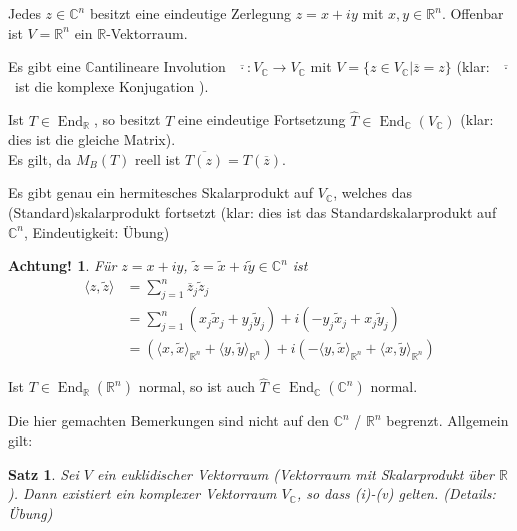 \documentclass[12pt,a4paper]{article}
\newtheorem{theorem}{Satz}
\newtheorem*{attention}{Achtung!}
\theoremstyle{definition}
\theoremstyle{remark}
\renewcommand{\bar}[1]{\overline{#1}}
\renewcommand{\hat}[1]{\widehat{#1}}
\DeclareMathOperator{\End}{End}
\begin{document}
	\begin{proofenum}
		\item Jedes $z \in \mathbb{C}^n$ besitzt eine eindeutige Zerlegung $z = x+iy$ mit $x,y \in \mathbb{R}^n$. Offenbar ist $V = \mathbb{R}^n$ ein $\mathbb{R}$-Vektorraum.
		\item Es gibt eine $\mathbb{C}$antilineare Involution \ $\bar{\cdot}: V_{\mathbb{C}} \rightarrow V_{\mathbb{C}}$ mit $V = \{ z \in V_{\mathbb{C}} | \bar{z} = z \}$ (klar: \ $\bar{\cdot}$ \ ist die komplexe Konjugation ).
		\item Ist $T \in \End_{\mathbb{R}}$, so besitzt $T$ eine eindeutige Fortsetzung $\hat{T} \in \End_{\mathbb{C}}(V_{\mathbb{C}})$ (klar: dies ist die gleiche Matrix). \\
		Es gilt, da $M_B(T)$ reell ist $\bar{T(z)} = T(\bar{z})$.
		\item Es gibt genau ein hermitesches Skalarprodukt auf $V_{\mathbb{C}}$, welches das (Standard)skalarprodukt fortsetzt (klar: dies ist das Standardskalarprodukt auf $\mathbb{C}^n$, Eindeutigkeit: Übung)
	\begin{attention}
		Für $z = x + iy$, $\tilde{z} = \tilde{x} + i \tilde{y} \in \mathbb{C}^n$ ist
		\begin{equation}
			\begin{split}
				\langle z, \tilde{z} \rangle &= \sum\limits_{j=1}^n \bar{z}_j \tilde{z}_j \\
				&= \sum\limits_{j=1}^n (x_j \tilde{x}_j+y_j \tilde{y}_j)+i(-y_j \tilde{x}_j+x_j \tilde{y}_j) \\
				&= (\langle x,\tilde{x} \rangle_{\mathbb{R}^n} + \langle y, \tilde{y} \rangle_{\mathbb{R}^n})+i(-\langle y,\tilde{x} \rangle_{\mathbb{R}^n} + \langle x,\tilde{y} \rangle_{\mathbb{R}^n})
			\end{split}
		\end{equation}
	\end{attention}
		\item Ist $T \in \End_{\mathbb{R}}(\mathbb{R}^n)$ normal, so ist auch $\hat{T} \in \End_{\mathbb{C}}(\mathbb{C}^n)$ normal.
	\end{proofenum}
	Die hier gemachten Bemerkungen sind nicht auf den $\mathbb{C}^n$ / $\mathbb{R}^n$ begrenzt. Allgemein gilt: \\
	\begin{theorem}
		Sei $V$ ein euklidischer Vektorraum (Vektorraum mit Skalarprodukt über $\mathbb{R}$). Dann existiert ein komplexer Vektorraum $V_{\mathbb{C}}$, so dass (i)-(v) gelten. (Details: Übung)
	\end{theorem}
\end{document}

